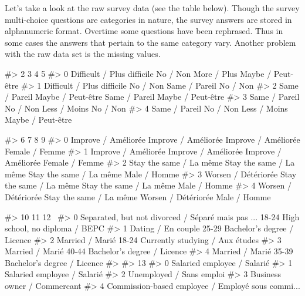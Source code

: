 Let's take a look at the raw survey data (see the table below). Though
the survey multi-choice questions are categories in nature, the survey
answers are stored in alphanumeric format. Overtime some questions have
been rephrased. Thus in some cases the answers that pertain to the same
category vary. Another problem with the raw data set is the missing
values.

\begin{Schunk}
\begin{Soutput}
#>                             2                  3              4                  5
#> 0  Difficult / Plus difficile           No / Non    More / Plus  Maybe / Peut-être
#> 1  Difficult / Plus difficile           No / Non  Same / Pareil           No / Non
#> 2               Same / Pareil  Maybe / Peut-être  Same / Pareil  Maybe / Peut-être
#> 3               Same / Pareil           No / Non   Less / Moins           No / Non
#> 4               Same / Pareil           No / Non   Less / Moins  Maybe / Peut-être
\end{Soutput}
\begin{Soutput}
#>                          6                        7                        8               9
#> 0      Improve / Améliorée      Improve / Améliorée      Improve / Améliorée  Female / Femme
#> 1      Improve / Améliorée      Improve / Améliorée      Improve / Améliorée  Female / Femme
#> 2  Stay the same / La même  Stay the same / La même  Stay the same / La même    Male / Homme
#> 3      Worsen / Détériorée  Stay the same / La même  Stay the same / La même    Male / Homme
#> 4      Worsen / Détériorée  Stay the same / La même      Worsen / Détériorée    Male / Homme
\end{Soutput}
\begin{Soutput}
#>                                                   10     11                               12  \
#> 0  Separated, but not divorced / Séparé mais pas ...  18-24   High school, no diploma / BEPC   
#> 1                                 Dating / En couple  25-29      Bachelor’s degree / Licence   
#> 2                                    Married / Marié  18-24  Currently studying / Aux études   
#> 3                                    Married / Marié  40-44      Bachelor’s degree / Licence   
#> 4                                    Married / Marié  35-39      Bachelor’s degree / Licence   
#> 
#>                                                   13  
#> 0                        Salaried employee / Salarié  
#> 1                        Salaried employee / Salarié  
#> 2                           Unemployed / Sans emploi  
#> 3                        Business owner / Commercant  
#> 4  Commission-based employee / Employé sous commi...
\end{Soutput}
\end{Schunk}

